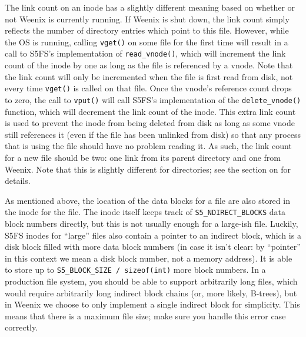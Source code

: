 The link count on an inode has a slightly different meaning based on whether or not Weenix is currently running. If Weenix is shut down, the link count simply reflects the number of directory entries which point to this file. However, while the OS is running, calling \texttt{vget()} on some file for the first time will result in a call to S5FS's implementation of \texttt{read\_vnode()}, which will increment the link count of the inode by one as long as the file is referenced by a vnode. Note that the link count will only be incremented when the file is first read from disk, not every time \texttt{vget()} is called on that file. Once the vnode's reference count drops to zero, the call to \texttt{vput()} will call S5FS's implementation of the \texttt{delete\_vnode()} function, which will decrement the link count of the inode. This extra link count is used to prevent the inode from being deleted from disk as long as some vnode still references it (even if the file has been unlinked from disk) so that any process that is using the file should have no problem reading it. As such, the link count for a new file should be two: one link from its parent directory and one from Weenix. Note that this is slightly different for directories; see the section on  for details.

As mentioned above, the location of the data blocks for a file are also stored in the inode for the file. The inode itself keeps track of \texttt{S5\_NDIRECT\_BLOCKS} data block numbers directly, but this is not usually enough for a large-ish file. Luckily, S5FS inodes for ``large'' files also contain a pointer to an indirect block, which is a disk block filled with more data block numbers (in case it isn't clear: by ``pointer'' in this context we mean a disk block number, not a memory address). It is able to store up to \texttt{S5\_BLOCK\_SIZE / sizeof(int)} more block numbers. In a production file system, you should be able to support arbitrarily long files, which would require arbitrarily long indirect block chains (or, more likely, B-trees), but in Weenix we choose to only implement a single indirect block for simplicity. This means that there is a maximum file size; make sure you handle this error case correctly.

